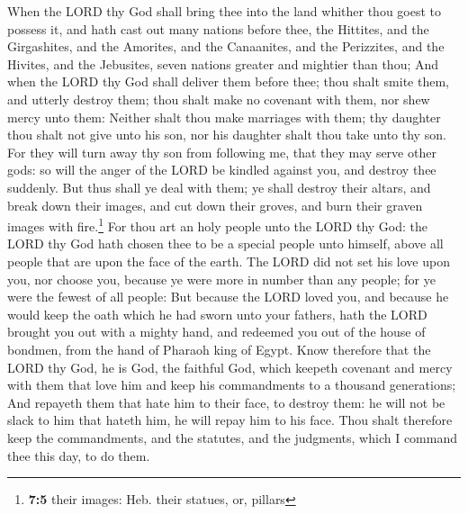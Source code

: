  When the LORD thy God shall bring thee into the land
whither thou goest to possess it, and hath cast out many nations before
thee, the Hittites, and the Girgashites, and the Amorites, and the
Canaanites, and the Perizzites, and the Hivites, and the Jebusites,
seven nations greater and mightier than thou;  And when
the LORD thy God shall deliver them before thee; thou shalt smite them,
and utterly destroy them; thou shalt make no covenant with them, nor
shew mercy unto them:  Neither shalt thou make marriages
with them; thy daughter thou shalt not give unto his son, nor his
daughter shalt thou take unto thy son.  For they will turn
away thy son from following me, that they may serve other gods: so will
the anger of the LORD be kindled against you, and destroy thee suddenly.
 But thus shall ye deal with them; ye shall destroy their
altars, and break down their images, and cut down their groves, and burn
their graven images with fire.\footnote{\textbf{7:5} their images: Heb.
  their statues, or, pillars}  For thou art an holy people
unto the LORD thy God: the LORD thy God hath chosen thee to be a special
people unto himself, above all people that are upon the face of the
earth.  The LORD did not set his love upon you, nor choose
you, because ye were more in number than any people; for ye were the
fewest of all people:  But because the LORD loved you, and
because he would keep the oath which he had sworn unto your fathers,
hath the LORD brought you out with a mighty hand, and redeemed you out
of the house of bondmen, from the hand of Pharaoh king of Egypt.
 Know therefore that the LORD thy God, he is God, the
faithful God, which keepeth covenant and mercy with them that love him
and keep his commandments to a thousand generations;  And
repayeth them that hate him to their face, to destroy them: he will not
be slack to him that hateth him, he will repay him to his face.
 Thou shalt therefore keep the commandments, and the
statutes, and the judgments, which I command thee this day, to do them.

